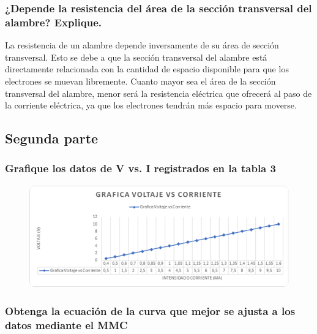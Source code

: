 \documentclass[10pt]{article}
\begin{document}
\begin{multicols}{2}
	\subsubsection*{¿Depende la resistencia del área de la sección transversal del alambre?
		Explique.}

	La resistencia de un alambre depende inversamente de su área de sección
	transversal. Esto se debe a que la sección transversal del alambre está
	directamente relacionada con la cantidad de espacio disponible para que
	los electrones se muevan libremente. Cuanto mayor sea el área de la sección
	transversal del alambre, menor será la resistencia eléctrica que ofrecerá
	al paso de la corriente eléctrica, ya que los electrones tendrán más
	espacio para moverse.%

	\subsection{Segunda parte}

	\subsubsection*{Grafique los datos de V vs. I registrados en la tabla 3}

	\begin{figure}[H]
		\includegraphics[scale = .55]{./Images/Grafica.png}
	\end{figure}

	\subsubsection*{Obtenga la ecuación de la curva que mejor se ajusta a los datos mediante el MMC}


\end{multicols}
\end{document}
